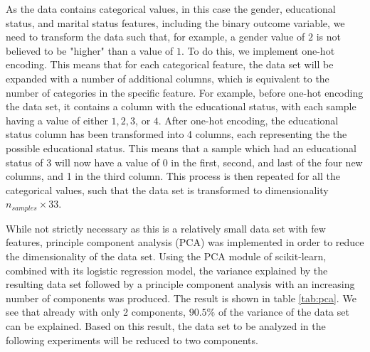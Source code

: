 \documentclass[a4paper,10pt,english]{article}
\begin{document}
As the data contains categorical values, in this case the gender, educational status, and marital status features, including the binary outcome variable, we need to transform the data such that, for example, a gender value of $2$ is not believed to be "higher" than a value of $1$. To do this, we implement one-hot encoding. This means that for each categorical feature, the data set will be expanded with a number of additional columns, which is equivalent to the number of categories in the specific feature. For example, before one-hot encoding the data set, it contains a column with the educational status, with each sample having a value of either $1, 2, 3$, or $4$. After one-hot encoding, the educational status column has been transformed into 4 columns, each representing the the possible educational status. This means that a sample which had an educational status of $3$ will now have a value of $0$ in the first, second, and last of the four new columns, and 1 in the third column. This process is then repeated for all the categorical values, such that the data set is transformed to dimensionality $n_{samples} \times 33$. 

While not strictly necessary as this is a relatively small data set with few features, principle component analysis (PCA) was implemented in order to reduce the dimensionality of the data set. Using the PCA module of scikit-learn, combined with its logistic regression model, the variance explained by the resulting data set followed by a principle component analysis with an increasing number of components was produced. The result is shown in table \ref{tab:pca}. We see that already with only 2 components, $90.5\%$ of the variance of the data set can be explained. Based on this result, the data set to be analyzed in the following experiments will be reduced to two components.
\end{document}
